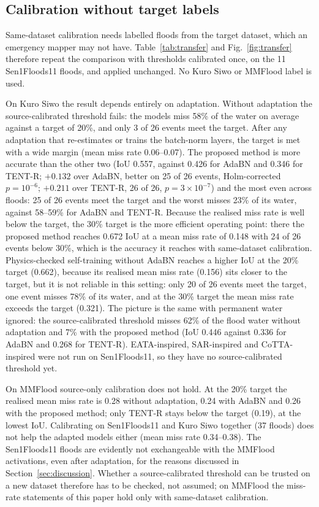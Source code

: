 \documentclass[a4paper,fleqn]{cas-sc}
\begin{document}
\subsection{Calibration without target labels}
\label{sec:transfer}
Same-dataset calibration needs labelled floods from the target dataset, which an emergency mapper may not have. Table~\ref{tab:transfer} and Fig.~\ref{fig:transfer} therefore repeat the comparison with thresholds calibrated once, on the 11 Sen1Floods11 floods, and applied unchanged. No Kuro Siwo or MMFlood label is used.

On Kuro Siwo the result depends entirely on adaptation. Without adaptation the source-calibrated threshold fails: the models miss 58\% of the water on average against a target of 20\%, and only 3 of 26 events meet the target. After any adaptation that re-estimates or trains the batch-norm layers, the target is met with a wide margin (mean miss rate 0.06--0.07). The proposed method is more accurate than the other two (IoU 0.557, against 0.426 for AdaBN and 0.346 for TENT-R; $+0.132$ over AdaBN, better on 25 of 26 events, Holm-corrected $p=10^{-6}$; $+0.211$ over TENT-R, 26 of 26, $p=3\times10^{-7}$) and the most even across floods: 25 of 26 events meet the target and the worst misses 23\% of its water, against 58--59\% for AdaBN and TENT-R. Because the realised miss rate is well below the target, the 30\% target is the more efficient operating point: there the proposed method reaches 0.672 IoU at a mean miss rate of 0.148 with 24 of 26 events below 30\%, which is the accuracy it reaches with same-dataset calibration. Physics-checked self-training without AdaBN reaches a higher IoU at the 20\% target (0.662), because its realised mean miss rate (0.156) sits closer to the target, but it is not reliable in this setting: only 20 of 26 events meet the target, one event misses 78\% of its water, and at the 30\% target the mean miss rate exceeds the target (0.321). The picture is the same with permanent water ignored: the source-calibrated threshold misses 62\% of the flood water without adaptation and 7\% with the proposed method (IoU 0.446 against 0.336 for AdaBN and 0.268 for TENT-R). EATA-inspired, SAR-inspired and CoTTA-inspired were not run on Sen1Floods11, so they have no source-calibrated threshold yet.

On MMFlood source-only calibration does not hold. At the 20\% target the realised mean miss rate is 0.28 without adaptation, 0.24 with AdaBN and 0.26 with the proposed method; only TENT-R stays below the target (0.19), at the lowest IoU. Calibrating on Sen1Floods11 and Kuro Siwo together (37 floods) does not help the adapted models either (mean miss rate 0.34--0.38). The Sen1Floods11 floods are evidently not exchangeable with the MMFlood activations, even after adaptation, for the reasons discussed in Section~\ref{sec:discussion}. Whether a source-calibrated threshold can be trusted on a new dataset therefore has to be checked, not assumed; on MMFlood the miss-rate statements of this paper hold only with same-dataset calibration.
\end{document}

